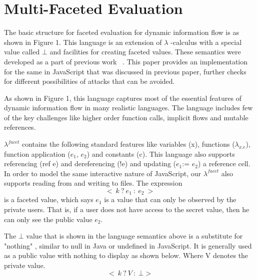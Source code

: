 \chapter{Multi-Faceted Evaluation}
The basic structure for faceted evaluation for dynamic information flow is as shown in Figure 1. This language is an extension of $\lambda$ -calculus with a special value called $\bot$ and facilities for creating faceted values. These semantics were developed as a part of previous work ~\cite{bib4}. This paper provides an implementation for the same in JavaScript that was discussed in previous paper, further checks for different possibilities of attacks that can be avoided. 

As shown in Figure 1, this language captures most of the essential features of dynamic information flow in many realistic languages. The language includes few of the key challenges like higher order function calls, implicit flows and mutable references. 

$\lambda^{facet}$ contains the following standard features like variables (x), functions ($\lambda_{x.e}$), function application ($e_{1}$, $e_{2}$) and constants (c). This language also supports referencing (ref e) and dereferencing (!e) and updating ($e_{1}$:= $e_{2}$) a reference cell. In order to model the same interactive nature of JavaScript, our $\lambda^{facet}$ also supports reading from and writing to files. The expression 
$$
<\ k\ ?\ e_{1}\ :\ e_{2}\ >
$$
is a faceted value, which says $e_{1}$ is a value that can only be observed by the private users. That is, if a user does not have access to the secret value, then he can only see the public value $e_{2}$.

The $\bot$ value that is shown in the language semantics above is a substitute for "nothing" , similar to null in Java or undefined in JavaScript. It is generally used as a public value with nothing to display as shown below. Where V denotes the private value. 
$$
<\ k\ ?\ V\ :\ \bot>
$$

